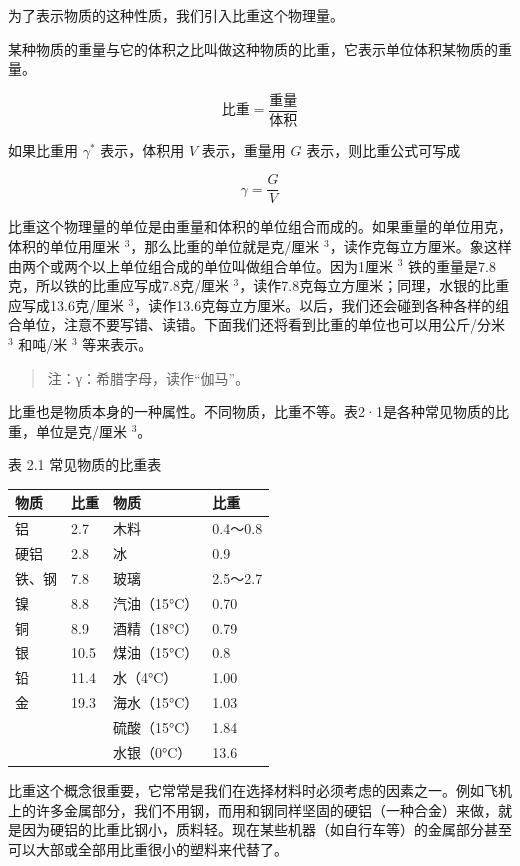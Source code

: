 为了表示物质的这种性质，我们引入比重这个物理量。

某种物质的重量与它的体积之比叫做这种物质的比重，它表示单位体积某物质的重量。

\[
\text{比重} = \frac {\text{重量}}{\text{体积}}
\]

如果比重用 \(\gamma^{*}\) 表示，体积用 \(V\) 表示，重量用 \(G\)
表示，则比重公式可写成

\[
\gamma = \frac {G}{V}
\]

比重这个物理量的单位是由重量和体积的单位组合而成的。如果重量的单位用克，体积的单位用厘米
\(^{3}\)，那么比重的单位就是克/厘米
\(^{3}\)，读作克每立方厘米。象这样由两个或两个以上单位组合成的单位叫做组合单位。因为1厘米
\(^{3}\) 铁的重量是7.8克，所以铁的比重应写成7.8克/厘米
\(^{3}\)，读作7.8克每立方厘米；同理，水银的比重应写成13.6克/厘米
\(^{3}\)，读作13.6克每立方厘米。以后，我们还会碰到各种各样的组合单位，注意不要写错、读错。下面我们还将看到比重的单位也可以用公斤/分米
\(^{3}\) 和吨/米 \(^{3}\) 等来表示。

\begin{quote}
注：γ：希腊字母，读作``伽马''。
\end{quote}

比重也是物质本身的一种属性。不同物质，比重不等。表2·1是各种常见物质的比重，单位是克/厘米
\(^{3}\)。

表 2.1 常见物质的比重表

{\def\LTcaptype{none} %
\begin{longtable}[]{@{}llll@{}}
\toprule\noalign{}
物质 & 比重 & 物质 & 比重 \\
\midrule\noalign{}
\endhead
\bottomrule\noalign{}
\endlastfoot
铝 & 2.7 & 木料 & 0.4～0.8 \\
硬铝 & 2.8 & 冰 & 0.9 \\
铁、钢 & 7.8 & 玻璃 & 2.5～2.7 \\
镍 & 8.8 & 汽油（15°C） & 0.70 \\
铜 & 8.9 & 酒精（18°C） & 0.79 \\
银 & 10.5 & 煤油（15°C） & 0.8 \\
铅 & 11.4 & 水（4°C） & 1.00 \\
金 & 19.3 & 海水（15°C） & 1.03 \\
& & 硫酸（15°C） & 1.84 \\
& & 水银（0°C） & 13.6 \\
\end{longtable}
}

比重这个概念很重要，它常常是我们在选择材料时必须考虑的因素之一。例如飞机上的许多金属部分，我们不用钢，而用和钢同样坚固的硬铝（一种合金）来做，就是因为硬铝的比重比钢小，质料轻。现在某些机器（如自行车等）的金属部分甚至可以大部或全部用比重很小的塑料来代替了。

